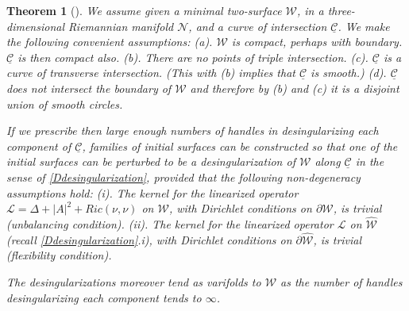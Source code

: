 \documentclass[12pt,namelimits,sumlimits]{amsart}
\newtheorem{theorem}{Theorem}[section]
\theoremstyle{remark}
\numberwithin{equation}{section}
\begin{document}
\addtocounter{equation}{1}
\begin{theorem}[\cite{kapouleas:compact}]
\label{Tmain}
We assume given
a minimal two-surface ${{\mathcal{W}}}$,
in a three-dimen\-si\-o\-nal Riemannian manifold ${{\mathcal{N}}}$,
and a curve of intersection ${\underline{{\mathcal{C}}}}$.
We make the following convenient assumptions:
\newline
(a). ${{\mathcal{W}}}$ is compact, perhaps with boundary.
${\underline{{\mathcal{C}}}}$ is then compact also.
\newline
(b).
There are no points of triple intersection.
\newline
(c).
${\underline{{\mathcal{C}}}}$ is a curve of transverse intersection.
(This with (b) implies that ${\underline{{\mathcal{C}}}}$ is smooth.)
\newline
(d). ${\underline{{\mathcal{C}}}}$ does not intersect the boundary of ${{\mathcal{W}}}$ and therefore by (b) and (c)
it is a disjoint union of smooth circles.

If we prescribe then large enough numbers of handles in desingularizing each component of ${\underline{{\mathcal{C}}}}$,
families of initial surfaces can be constructed so that one of the initial surfaces can be perturbed to be a desingularization
of ${{\mathcal{W}}}$ along ${\underline{{\mathcal{C}}}}$ in the sense of \ref{Ddesingularization},
provided that the following non-degeneracy assumptions hold:
\newline
(i).
The kernel for the linearized operator
${\ensuremath{\mathcal L}} =\Delta+|A|^2+Ric(\nu,\nu)$ on ${{\mathcal{W}}}$,
with Dirichlet conditions on $\partial{{\mathcal{W}}}$,
is trivial (unbalancing condition).
\newline
(ii).
The kernel for the linearized operator
${\ensuremath{\mathcal L}}$ on ${{\widehat{{\mathcal{W}}}}}$ (recall \ref{Ddesingularization}.i),
with Dirichlet conditions on $\partial{{\widehat{{\mathcal{W}}}}}$,
is trivial (flexibility condition).

The desingularizations moreover tend as varifolds
to ${{\mathcal{W}}}$ as the number of handles desingularizing each component tends
to $\infty$.
\end{theorem}
\end{document}
